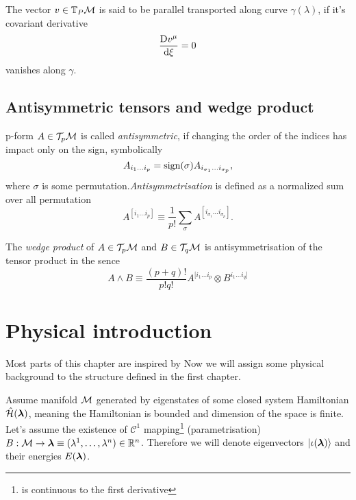 The vector $v\in \mathbb{T}_P\mathcal{M}$ is said to be parallel transported along curve $\gamma(\lambda)$, if it's covariant derivative
\begin{equation}
    \frac{\mathrm{D} v^\mu}{\mathrm{d} \xi}=0
\end{equation}
vanishes along $\gamma$.

\section{Antisymmetric tensors and wedge product}
p-form $A\in \mathcal{T}_p \mathcal{M}$ is called \emph{antisymmetric}, if changing the order of the indices has impact only on the sign, symbolically
$$A_{i_1\dots i_p} = \operatorname{\textrm{sign}}(\sigma)A_{i_{\sigma_1}\dots i_{\sigma_p}},$$
where $\sigma$ is some permutation.\emph{Antisymmetrisation} is defined as a normalized sum over all permutation
\begin{equation}
    A^{[i_1\dots i_p]}\equiv \frac{1}{p!}\sum_\sigma A^{[i_{\sigma_1}\dots i_{\sigma_p}]}. 
\end{equation}

The \emph{wedge product} of $A\in \mathcal{T}_p \mathcal{M}$ and $B\in \mathcal{T}_q \mathcal{M}$ is antisymmetrisation of the tensor product in the sence
\begin{equation}
    A\wedge B\equiv \frac{(p+q)!}{p!q!} A^{[i_1\dots i_p}\otimes B^{i_1\dots i_q]}
\end{equation}



\chapter{Physical introduction}
Most parts of this chapter are inspired by \citep{geomMain}
Now we will assign some physical background to the structure defined in the first chapter.

Assume manifold $\mathcal{M}$ generated by eigenstates of some closed system Hamiltonian $\hat{\mathcal{H}}(\bm\lambda)$, meaning the Hamiltonian is bounded and dimension of the space is finite. Let's assume the existence of $\mathcal{C}^1$ mapping\footnote{is continuous to the first derivative} (parametrisation) $B: \mathcal{M}\rightarrow \bm{\bm\lambda}\equiv (\lambda^1,\dots,\lambda^n)\in\mathbb{R}^n$. Therefore we will denote eigenvectors $\ket{\iota(\bm{\bm\lambda})}$ and their energies $E(\bm{\bm\lambda})$.

